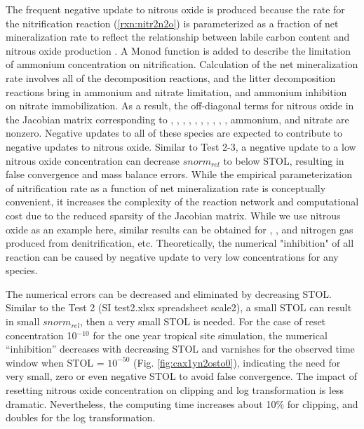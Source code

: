 \documentclass[gmd, manuscript]{copernicus}
\begin{document}
The frequent negative update to nitrous oxide is produced because the rate for
the nitrification reaction (\ref{rxn:nitr2n2o}) is parameterized as a fraction
of net mineralization rate to reflect the relationship between labile carbon
content and nitrous oxide production \citep{Parton1996}. A Monod function is
added to describe the limitation of ammonium concentration on nitrification.
Calculation of the net mineralization rate involves all of the decomposition
reactions, and the litter decomposition reactions bring in ammonium and nitrate
limitation, and ammonium inhibition on nitrate immobilization. As a result, the
off-diagonal terms for nitrous oxide in the Jacobian matrix corresponding to
, , , , ,
, , , , , ammonium, and
nitrate are nonzero. Negative updates to all of these species are expected to
contribute to negative updates to nitrous oxide. Similar to Test 2-3, a negative
update to a low nitrous oxide concentration can decrease $snorm_{rel}$ to below STOL,
resulting in false convergence and mass balance errors. While the empirical
parameterization of nitrification rate as a function of net mineralization rate
is conceptually convenient, it increases the complexity of the reaction network
and computational cost due to the reduced sparsity of the Jacobian matrix. While we use
nitrous oxide as an example here, similar results can be obtained for
, , and nitrogen gas produced from denitrification,
etc. Theoretically, the numerical "inhibition" of all reaction can be caused by
negative update to very low concentrations for any species. 

The numerical errors can be decreased and eliminated by decreasing STOL.
Similar to the Test 2 (SI test2.xlsx spreadsheet scale2), a small STOL can result in
small $snorm_{rel}$, then a very small STOL is needed. For the case of reset
concentration 10$^{-10}$ for the one year tropical site simulation, the
numerical ``inhibition'' decreases with decreasing STOL and varnishes for the
observed time window when STOL = $10^{-50}$ (Fig. \ref{fig:cax1yn2osto0}),
indicating the need for very small, zero or even negative STOL to avoid false
convergence. The impact of resetting nitrous oxide concentration on clipping
and log transformation is less dramatic. Nevertheless, the computing time
increases about 10\% for clipping, and doubles for the log transformation.  

\end{document}
